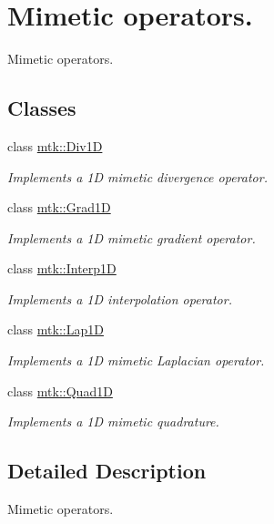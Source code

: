 \hypertarget{group__c07-mim__ops}{\section{Mimetic operators.}
\label{group__c07-mim__ops}
}


Mimetic operators.  


\subsection*{Classes}
\begin{DoxyCompactItemize}
\item 
class \hyperlink{classmtk_1_1Div1D}{mtk\+::\+Div1\+D}
\begin{DoxyCompactList}\small\item\em Implements a 1\+D mimetic divergence operator. \end{DoxyCompactList}\item 
class \hyperlink{classmtk_1_1Grad1D}{mtk\+::\+Grad1\+D}
\begin{DoxyCompactList}\small\item\em Implements a 1\+D mimetic gradient operator. \end{DoxyCompactList}\item 
class \hyperlink{classmtk_1_1Interp1D}{mtk\+::\+Interp1\+D}
\begin{DoxyCompactList}\small\item\em Implements a 1\+D interpolation operator. \end{DoxyCompactList}\item 
class \hyperlink{classmtk_1_1Lap1D}{mtk\+::\+Lap1\+D}
\begin{DoxyCompactList}\small\item\em Implements a 1\+D mimetic Laplacian operator. \end{DoxyCompactList}\item 
class \hyperlink{classmtk_1_1Quad1D}{mtk\+::\+Quad1\+D}
\begin{DoxyCompactList}\small\item\em Implements a 1\+D mimetic quadrature. \end{DoxyCompactList}\end{DoxyCompactItemize}


\subsection{Detailed Description}
Mimetic operators. 